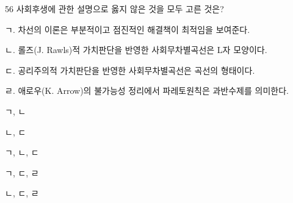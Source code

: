 \begin{question}{56}
사회후생에 관한 설명으로 옳지 않은 것을 모두 고른 것은?
\begin{framedtext}
ㄱ. 차선의 이론은 부분적이고 점진적인 해결책이 최적임을 보여준다. \par
ㄴ. 롤즈(J. Rawls)적 가치판단을 반영한 사회무차별곡선은 L자 모양이다. \par
ㄷ. 공리주의적 가치판단을 반영한 사회무차별곡선은 곡선의 형태이다. \par
ㄹ. 애로우(K. Arrow)의 불가능성 정리에서 파레토원칙은 과반수제를 의미한다. \par
\end{framedtext}
\begin{choices}
  \item ㄱ, ㄴ
  \item ㄴ, ㄷ
  \item ㄱ, ㄴ, ㄷ
  \item ㄱ, ㄷ, ㄹ
  \item ㄴ, ㄷ, ㄹ
\end{choices}
\end{question}
